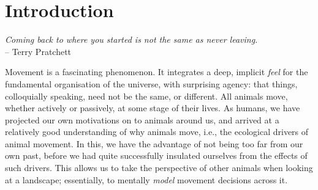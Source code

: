 
%
\chapter*{Introduction}

{}

\begin{center}
    \emph{Coming back to where you started is not the same as never leaving.}\\
    \medskip
    -- \small{Terry Pratchett}
\end{center}

Movement is a fascinating phenomenon.
It integrates a deep, implicit \textit{feel} for the fundamental organisation of the universe, with surprising agency: that things, colloquially speaking, need not be the same, or different.
All animals move, whether actively or passively, at some stage of their lives.
As humans, we have projected our own motivations on to animals around us, and arrived at a relatively good understanding of why animals move, i.e., the ecological drivers of animal movement.
In this, we have the advantage of not being too far from our own past, before we had quite successfully insulated ourselves from the effects of such drivers.
This allows us to take the perspective of other animals when looking at a landscape; essentially, to mentally \textit{model} movement decisions across it.

\vfill

\clearpage
